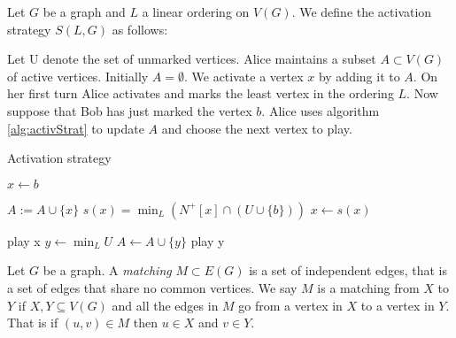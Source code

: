 \begin{definition} 
    Let $G$ be a graph and $L$ a linear ordering on $V(G)$. We define the activation strategy $S(L,G)$ as follows:
    
    Let U denote the set of unmarked vertices. Alice maintains a subset $A \subset V(G)$ of active vertices. Initially $A = \emptyset$. We activate a vertex $x$ by adding it to $A$. On her first turn Alice activates and marks the least vertex in the ordering $L$. Now suppose that Bob has just marked the vertex $b$. Alice uses algorithm \ref{alg:activStrat} to update $A$ and choose the next vertex to play.
    \begin{algorithm}[h]
        \caption{Activation strategy}
        \label{alg:activStrat}
        \begin{algorithmic}[1]
            \Statex
            \State $x \gets b$ 
            
                \State $A := A \cup \{x\}$
                \State $s(x) =\min_L(N^+[x] \cap (U \cup \{b\} ))$
                \State $x \gets s(x)$
            \EndWhile      
            
                \State play x
            \Else
                \State $y \gets \min_L U$
                    \State $A \gets A \cup \{y\}$                    
                \EndIf     
                \State play y
            \EndIf   
        \end{algorithmic}
    \end{algorithm}
    
\end{definition}

\begin{definition}[Matching]
    Let $G$ be a graph. A \textit{matching} $M\subset E(G)$ is a set of independent edges, that is a set of edges that share no common vertices. We say $M$ is a matching from $X$ to $Y$ if $X,Y\subseteq V(G)$ and all the edges in $M$ go from a vertex in $X$ to a vertex in $Y$. That is if $(u,v)\in M$ then $u\in X$ and $v\in Y$. 
\end{definition}

